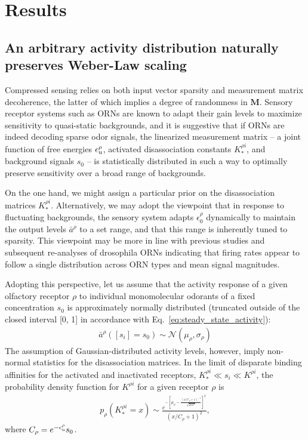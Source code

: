 \documentclass[9pt,twocolumn,twoside]{pnas-new}
\begin{document}
\section*{Results}

\subsection*{An arbitrary activity distribution naturally preserves Weber-Law scaling} 


Compressed sensing relies on both input vector sparsity and measurement matrix decoherence, the latter of which implies a degree of randomness in $\mathbf M$. Sensory receptor systems such as ORNs are known to adapt their gain levels to maximize sensitivity to quasi-static backgrounds, and it is suggestive that if ORNs are indeed decoding sparse odor signals, the linearized measurement matrix -- a joint function of free energies $\epsilon_{\text u}^\rho$, activated disassociation constants $K_*^{\rho i}$, and background signals $s_0$ -- is statistically distributed in such a way to optimally preserve sensitivity over a broad range of backgrounds. 

On the one hand, we might assign a particular prior on the disassociation matrices $K_*^{\rho i}$. Alternatively, we may adopt the viewpoint that in response to fluctuating backgrounds, the sensory system adapts $\epsilon^\rho_0$ dynamically to maintain the output levels $\bar a^\rho$ to a set range, and that this range is inherently tuned to sparsity. This viewpoint may be more in line with previous studies and subsequent re-analyses of drosophila ORNs indicating that firing rates appear to follow a single distribution across ORN types and mean signal magnitudes. 

Adopting this perspective, let us assume that the activity response of a given olfactory receptor $\rho$ to individual monomolecular odorants of a fixed concentration $s_0$ is approximately normally distributed (truncated outside of the closed interval [0, 1] in accordance with Eq.~\ref{eq:steady_state_activity}):
\begin{align}
\bar a^\rho([s_i] = s_0) \sim \mathcal N(\mu_\rho, \sigma_\rho)
\label{eq:monomolecular_activity_levels}
\end{align} 
The assumption of Gaussian-distributed activity levels, however, imply non-normal statistics for the disassociation matrices. In the limit of disparate binding affinities for the activated and inactivated receptors, $K^{\rho i}_* \ll s_i \ll K^{\rho i}$, the probability density function for $K^{\rho i}$ for a given receptor $\rho$ is
\begin{align}
p_\rho(K_*^{\rho i} = x)  \sim \frac{e^{-\left[\mu_\rho - \frac{(x/C_\rho + 1)^{-1}}{\sqrt{2\pi \sigma^2}}\right]^2}}{(x/C_\rho + 1)^2}, 
\label{eq:distribution_Kk2_normal_activity}
\end{align}
where $C_\rho = e^{-\epsilon_{\text u}^\rho}s_0$. 
\end{document}
